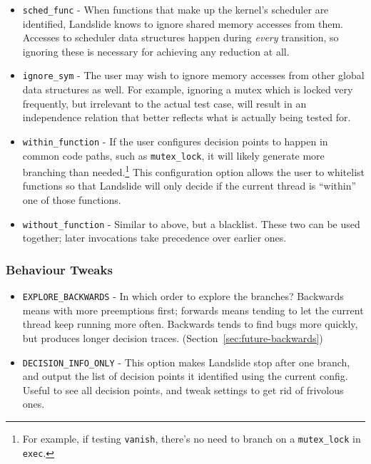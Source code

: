 \begin{itemize}
	\small
	\item \texttt{sched\_func} - When functions that make up the kernel's scheduler are identified, Landslide knows to ignore shared memory accesses from them. Accesses to scheduler data structures happen during {\em every} transition, so ignoring these is necessary for achieving any reduction at all.
	\item \texttt{ignore\_sym} - The user may wish to ignore memory accesses from other global data structures as well. For example, ignoring a mutex which is locked very frequently, but irrelevant to the actual test case, will result in an independence relation that better reflects what is actually being tested for.
	\item \texttt{within\_function} - If the user configures decision points to happen in common code paths, such as \texttt{mutex\_lock}, it will likely generate more branching than needed.\footnote{
For example, if testing \texttt{vanish}, there's no need to branch on a \texttt{mutex\_lock} in \texttt{exec}.}
This configuration option allows the user to whitelist functions so that Landslide will only decide if the current thread is ``within'' one of those functions.
	\item \texttt{without\_function} - Similar to above, but a blacklist. These two can be used together; later invocations take precedence over earlier ones.
\end{itemize}

\subsubsection{Behaviour Tweaks}
\begin{itemize}
	\small
	\item \texttt{EXPLORE\_BACKWARDS} - In which order to explore the branches? Backwards means with more preemptions first; forwards means tending to let the current thread keep running more often. Backwards tends to find bugs more quickly, but produces longer decision traces. (Section~\ref{sec:future-backwards})
	\item \texttt{DECISION\_INFO\_ONLY} - This option makes Landslide stop after one branch, and output the list of decision points it identified using the current config. Useful to see all decision points, and tweak settings to get rid of frivolous ones.
\end{itemize}

